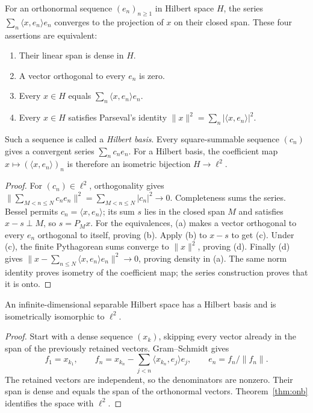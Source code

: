 \begin{theorem}\label{thm:onb}
For an orthonormal sequence $(e_n)_{n\ge1}$ in Hilbert space $H$, the series $\sum_n\langle x,e_n\rangle e_n$ converges to the projection of $x$ on their closed span. These four assertions are equivalent:
\begin{enumerate}
\item[(a)] Their linear span is dense in $H$.
\item[(b)] A vector orthogonal to every $e_n$ is zero.
\item[(c)] Every $x\in H$ equals $\sum_n\langle x,e_n\rangle e_n$.
\item[(d)] Every $x\in H$ satisfies Parseval's identity $\|x\|^2=\sum_n|\langle x,e_n\rangle|^2$.
\end{enumerate}
Such a sequence is called a \emph{Hilbert basis}. Every square-summable sequence $(c_n)$ gives a convergent series $\sum_nc_ne_n$. For a Hilbert basis, the coefficient map $x\mapsto(\langle x,e_n\rangle)_n$ is therefore an isometric bijection $H\to\ell^2$.
\end{theorem}
\begin{proof}
For $(c_n)\in\ell^2$, orthogonality gives $\|\sum_{M<n\le N}c_ne_n\|^2=\sum_{M<n\le N}|c_n|^2\to0$. Completeness sums the series. Bessel permits $c_n=\langle x,e_n\rangle$; its sum $s$ lies in the closed span $M$ and satisfies $x-s\perp M$, so $s=P_Mx$. For the equivalences, (a) makes a vector orthogonal to every $e_n$ orthogonal to itself, proving (b). Apply (b) to $x-s$ to get (c). Under (c), the finite Pythagorean sums converge to $\|x\|^2$, proving (d). Finally (d) gives $\|x-\sum_{n\le N}\langle x,e_n\rangle e_n\|^2\to0$, proving density in (a). The same norm identity proves isometry of the coefficient map; the series construction proves that it is onto.
\end{proof}

\begin{corollary}\label{cor:separable}
An infinite-dimensional separable Hilbert space has a Hilbert basis and is isometrically isomorphic to $\ell^2$.
\end{corollary}
\begin{proof}
Start with a dense sequence $(x_k)$, skipping every vector already in the span of the previously retained vectors. Gram--Schmidt gives
\[f_1=x_{k_1},\qquad f_n=x_{k_n}-\sum_{j<n}\langle x_{k_n},e_j\rangle e_j,\qquad e_n=f_n/\|f_n\|.\]
The retained vectors are independent, so the denominators are nonzero. Their span is dense and equals the span of the orthonormal vectors. Theorem~\ref{thm:onb} identifies the space with $\ell^2$.
\end{proof}

